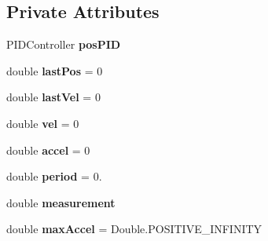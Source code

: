 \subsection*{Private Attributes}
\begin{DoxyCompactItemize}
\item 
\mbox{\label{classfrc_1_1robot_1_1controller_1_1_linear_profiler_a017684cb9963abe88b7d8f72b82ca442}} 
P\+I\+D\+Controller {\bfseries pos\+P\+ID}
\item 
\mbox{\label{classfrc_1_1robot_1_1controller_1_1_linear_profiler_a839e27d10ed93d637f67e97a6686be94}} 
double {\bfseries last\+Pos} = 0
\item 
\mbox{\label{classfrc_1_1robot_1_1controller_1_1_linear_profiler_a08e33e51091f847d9a9144db7cddf388}} 
double {\bfseries last\+Vel} = 0
\item 
\mbox{\label{classfrc_1_1robot_1_1controller_1_1_linear_profiler_a74383a070d098b36df249cbc23ce54cd}} 
double {\bfseries vel} = 0
\item 
\mbox{\label{classfrc_1_1robot_1_1controller_1_1_linear_profiler_a8965d299dcd9808b04b0afa8e83332ec}} 
double {\bfseries accel} = 0
\item 
\mbox{\label{classfrc_1_1robot_1_1controller_1_1_linear_profiler_add8a820ca58ffd729fcfac1fef9f35b6}} 
double {\bfseries period} = 0.
\item 
\mbox{\label{classfrc_1_1robot_1_1controller_1_1_linear_profiler_a079adc58a5b43d273fb29be03656d56e}} 
double {\bfseries measurement}
\item 
\mbox{\label{classfrc_1_1robot_1_1controller_1_1_linear_profiler_a8c5765e065d3f4727b6cd8161e3ed179}} 
double {\bfseries max\+Accel} = Double.\+P\+O\+S\+I\+T\+I\+V\+E\+\_\+\+I\+N\+F\+I\+N\+I\+TY
\item 

\end{DoxyCompactItemize}
